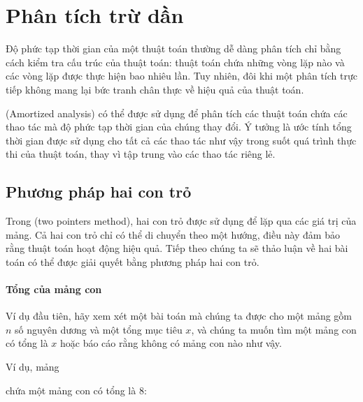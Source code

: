 \chapter{Phân tích trừ dần}


Độ phức tạp thời gian của một thuật toán
thường dễ dàng phân tích
chỉ bằng cách kiểm tra cấu trúc
của thuật toán:
thuật toán chứa những vòng lặp nào
và các vòng lặp được thực hiện bao nhiêu lần.
Tuy nhiên, đôi khi một phân tích trực tiếp
không mang lại bức tranh chân thực về hiệu quả của thuật toán.

 (Amortized analysis) có thể được sử dụng để phân tích
các thuật toán chứa các thao tác mà
độ phức tạp thời gian của chúng thay đổi.
Ý tưởng là ước tính tổng thời gian được sử dụng cho
tất cả các thao tác như vậy trong suốt
quá trình thực thi của thuật toán, thay vì tập trung
vào các thao tác riêng lẻ.

\section{Phương pháp hai con trỏ}


Trong  (two pointers method),
hai con trỏ được sử dụng để
lặp qua các giá trị của mảng.
Cả hai con trỏ chỉ có thể di chuyển theo một hướng,
điều này đảm bảo rằng thuật toán hoạt động hiệu quả.
Tiếp theo chúng ta sẽ thảo luận về hai bài toán có thể được giải quyết
bằng phương pháp hai con trỏ.

\subsubsection{Tổng của mảng con}

Ví dụ đầu tiên,
hãy xem xét một bài toán mà chúng ta
được cho một mảng gồm $n$ số nguyên dương
và một tổng mục tiêu $x$,
và chúng ta muốn tìm một mảng con có tổng là $x$
hoặc báo cáo rằng không có mảng con nào như vậy.

Ví dụ, mảng
\begin{center}
\end{center}
chứa một mảng con có tổng là 8:
\begin{center}
\end{center}

